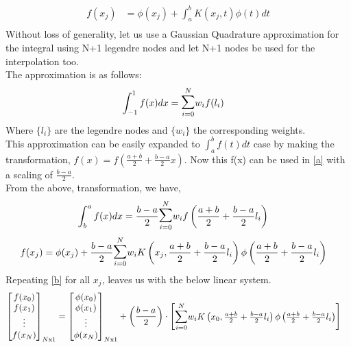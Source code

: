 \documentclass[letterpaper]{exam}
\begin{document}
\begin{questions}
\begin{solution}
\begin{align*}
f(x_j) &= \phi(x_j) + \int_{a}^{b} K(x_j,t)\phi(t)dt\\
\end{align*}
Without loss of generality, let us use a Gaussian Quadrature approximation for the integral using N+1 legendre nodes and let N+1 nodes be used for the interpolation too.\\
The approximation is as follows:
\begin{align*}
    \int_{-1}^{1} f(x) dx &= \overset{N}{\underset{i = 0}{\mathlarger{\mathlarger{\sum}}}} w_i f(l_i)
\end{align*}
Where $\{l_i\}$ are the legendre nodes and $\{w_i\}$ the corresponding weights.\\
This approximation can be easily expanded to $\int_{a}^{b} f(t) dt$ case by making the transformation, $f(x) = f\left(\frac{a+b}{2} + \frac{b-a}{2} x \right)$. Now this f(x) can be used in \ref{a} with a scaling of $\frac{b-a}{2}$.\\
From the above, transformation, we have, 
\begin{align}\label{a}
    \int_{b}^{a} f(x) dx &= \frac{b-a}{2}\overset{N}{\underset{i = 0}{\mathlarger{\mathlarger{\sum}}}} w_i f\left(\frac{a+b}{2} + \frac{b-a}{2} l_i \right)
\end{align}
\begin{align}\label{b}
    f(x_j) &= \phi(x_j) + \frac{b-a}{2} \overset{N}{\underset{i = 0}{\mathlarger{\mathlarger{\sum}}}} w_i K\left(x_j,\frac{a+b}{2} + \frac{b-a}{2} l_i\right)\phi\left(\frac{a+b}{2} + \frac{b-a}{2} l_i\right)
\end{align}
Repeating \ref{b} for all $x_j$, leaves us with the below linear system.
\begin{align*}
    \begin{bmatrix}
    f(x_0)\\
    f(x_1)\\
    \vdots\\
    f(x_N)
    \end{bmatrix}_{N\text{x}1} &= 
    \begin{bmatrix}
    \phi(x_0)\\
    \phi(x_1)\\
    \vdots\\
    \phi(x_N)
    \end{bmatrix}_{N\text{x}1}
    +
    \left(\frac{b-a}{2}\right)\cdot 
    \begin{bmatrix}
    \overset{N}{\underset{i = 0}{\mathlarger{\mathlarger{\sum}}}} w_i K\left(x_0,\frac{a+b}{2} + \frac{b-a}{2} l_i\right)\phi\left(\frac{a+b}{2} + \frac{b-a}{2} l_i\right)\\

\end{bmatrix}
\end{align*}
\end{solution}
\end{questions}
\end{document}
